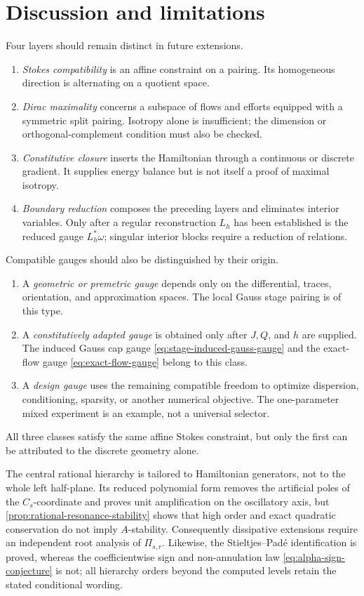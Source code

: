 \documentclass[11pt,a4paper]{article}
\begin{document}
\section{Discussion and limitations}

Four layers should remain distinct in future extensions.

\begin{enumerate}
  \item \emph{Stokes compatibility} is an affine constraint on a pairing.
  Its homogeneous direction is alternating on a quotient space.
  \item \emph{Dirac maximality} concerns a subspace of flows and efforts
  equipped with a symmetric split pairing. Isotropy alone is
  insufficient; the dimension or orthogonal-complement condition must also
  be checked.
  \item \emph{Constitutive closure} inserts the Hamiltonian through a
  continuous or discrete gradient. It supplies energy balance but is not
  itself a proof of maximal isotropy.
  \item \emph{Boundary reduction} composes the preceding layers and
  eliminates interior variables.  Only after a regular reconstruction \(L_h\)
  has been established is the reduced gauge \(L_h^*\omega\); singular
  interior blocks require a reduction of relations.
\end{enumerate}

Compatible gauges should also be distinguished by their origin.
\begin{enumerate}
  \item A \emph{geometric or premetric gauge} depends only on the
  differential, traces, orientation, and approximation spaces.  The local
  Gauss stage pairing is of this type.
  \item A \emph{constitutively adapted gauge} is obtained only after
  \(J,Q\), and \(h\) are supplied.  The induced Gauss cap gauge
  \cref{eq:stage-induced-gauss-gauge} and the exact-flow gauge
  \cref{eq:exact-flow-gauge} belong to this class.
  \item A \emph{design gauge} uses the remaining compatible freedom to
  optimize dispersion, conditioning, sparsity, or another numerical
  objective.  The one-parameter mixed experiment is an example, not a
  universal selector.
\end{enumerate}
All three classes satisfy the same affine Stokes constraint, but only the
first can be attributed to the discrete geometry alone.

The central rational hierarchy is tailored to Hamiltonian generators, not
to the whole left half-plane.  Its reduced polynomial form removes the
artificial poles of the \(C_s\)-coordinate and proves unit amplification
on the oscillatory axis, but \cref{prop:rational-resonance-stability}
shows that high order and exact quadratic conservation do not imply
\(A\)-stability.  Consequently dissipative extensions require an
independent root analysis of \(\Pi_{s,r}\).  Likewise, the Stieltjes--Pad\'e
identification is proved, whereas the coefficientwise sign and
non-annulation law \cref{eq:alpha-sign-conjecture} is not; all hierarchy
orders beyond the computed levels retain the stated conditional wording.
\end{document}
